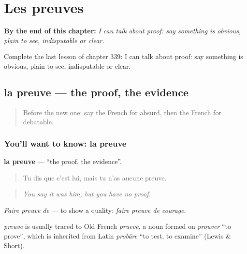 
\chapter{Les preuves}
\label{ch:fr-les-preuves}

\begin{chapteropening}
\textbf{By the end of this chapter:} \emph{I can talk about proof: say something is obvious, plain to see, indisputable or clear.}

Complete the last lesson of chapter 339: I can talk about proof: say something is obvious, plain to see, indisputable or clear.
\end{chapteropening}

\section[la preuve]{la preuve — the proof, the evidence}

\label{lesson:FR-C339-preuve}



\begin{quote}
Before the new one: say the French for absurd, then the French for debatable.
\end{quote}

\subsection*{You'll want to know: la preuve}
\textbf{la preuve} — \textquotedblleft{}the proof, the evidence\textquotedblright{}.

\begin{quote}
Tu dis que c'est lui, mais tu n'as aucune preuve.
\end{quote}

\begin{quote}
\emph{You say it was him, but you have no proof.}
\end{quote}

\emph{Faire preuve de} — to show a quality: \emph{faire preuve de courage}.

\begin{cousinweb}
\emph{preuve} is usually traced to Old French \emph{prueve}, a noun formed on \emph{prouver} \textquotedblleft{}to prove\textquotedblright{}, which is inherited from Latin \emph{probāre} \textquotedblleft{}to test, to examine\textquotedblright{} (Lewis \& Short).
\end{cousinweb}

